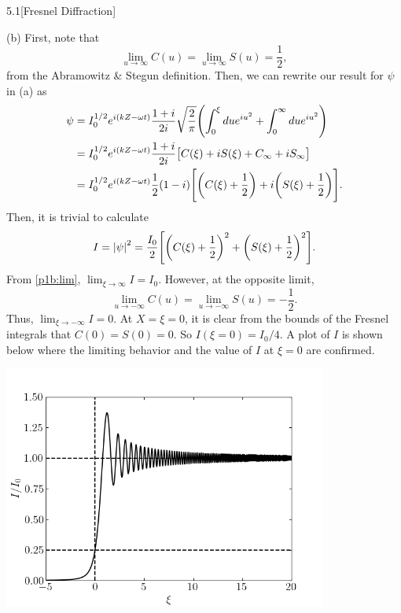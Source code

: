 \documentclass[12pt]{article}
\begin{document}
\begin{problem}{5.1}[Fresnel Diffraction]
\begin{solution}
(b) First, note that
\begin{equation}\label{p1b:lim}
    \lim_{u\to\infty}C(u)=\lim_{u\to\infty}S(u)=\frac12 ,
\end{equation}
from the Abramowitz \& Stegun definition. Then, we can rewrite our result for
$\psi$ in (a) as
\begin{align}
    \psi
    &=I_0^{1/2}e^{i(kZ-\omega t)}\frac{1+i}{2i}\sqrt{\frac2\pi}
    \qty(\int_0^\xi due^{iu^2}+\int_0^\infty du e^{iu^2})\notag\\
    &=I_0^{1/2}e^{i(kZ-\omega t)}\frac{1+i}{2i}
    \qty[C(\xi)+iS(\xi)+C_\infty+iS_\infty]\notag\\
    &=I_0^{1/2}e^{i(kZ-\omega
    t)}\frac12\qty(1-i)\qty[\qty(C(\xi)+\frac12)+i\qty(S(\xi)+\frac12)].
\end{align}
Then, it is trivial to calculate
\begin{align}
    I=\abs{\psi}^2
     =\frac{I_0}{2}\qty[\qty(C(\xi)+\frac12)^2+\qty(S(\xi)+\frac12)^2].
\end{align}
From \eqref{p1b:lim}, $\lim_{\xi\to\infty}I=I_0$. However, at the opposite
limit,
\begin{equation}
    \lim_{u\to-\infty}C(u)=\lim_{u\to-\infty}S(u)=-\frac12 .
\end{equation}
Thus, $\lim_{\xi\to-\infty}I=0$. At $X=\xi=0$, it is clear from the bounds of
the Fresnel integrals that $C(0)=S(0)=0$. So $I(\xi=0)=I_0/4$. A plot of $I$ is
shown below where the limiting behavior and the value of $I$ at $\xi=0$ are
confirmed.
\begin{center}
    \includegraphics[width=0.8\textwidth]{p1b.png} 
\end{center}
\end{solution}
\end{problem}
\newpage
\end{document}
